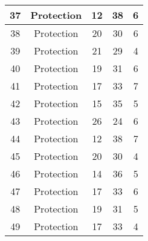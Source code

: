 \documentclass[results.tex]{subfiles}
\begin{document}
\begin{center}
\begin{tabular}{| c || c | c | c | c |}
            \hline
            37                      & Protection                   & 12                     & 38                      & 6                    \\
            \hline
            38                      & Protection                   & 20                     & 30                      & 6                    \\
            \hline
            39                      & Protection                   & 21                     & 29                      & 4                    \\
            \hline
            40                      & Protection                   & 19                     & 31                      & 6                    \\
            \hline
            41                      & Protection                   & 17                     & 33                      & 7                    \\
            \hline
            42                      & Protection                   & 15                     & 35                      & 5                    \\
            \hline
            43                      & Protection                   & 26                     & 24                      & 6                    \\
            \hline
            44                      & Protection                   & 12                     & 38                      & 7                    \\
            \hline
            45                      & Protection                   & 20                     & 30                      & 4                    \\
            \hline
            46                      & Protection                   & 14                     & 36                      & 5                    \\
            \hline
            47                      & Protection                   & 17                     & 33                      & 6                    \\
            \hline
            48                      & Protection                   & 19                     & 31                      & 5                    \\
            \hline
            49                      & Protection                   & 17                     & 33                      & 4                    \\
            \hline
        \end{tabular}
    \end{center}
\end{document}
